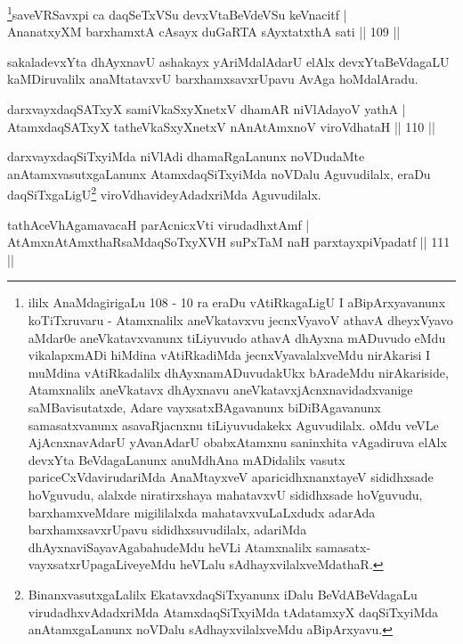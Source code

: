 \begin{shl}
\footnote{ililx AnaMdagirigaLu 108 - 10 ra eraDu vAtiRkagaLigU I aBipArxyavanunx koTiTxruvaru - Atamxnalilx aneVkatavxvu jecnxVyavoV athavA dheyxVyavo aMdar0e aneVkatavxvanunx tiLiyuvudo athavA dhAyxna mADuvudo eMdu vikalapxmADi hiMdina vAtiRkadiMda jecnxVyavalalxveMdu nirAkarisi I muMdina vAtiRkadalilx dhAyxnamADuvudakUkx bAradeMdu nirAkariside, Atamxnalilx aneVkatavx dhAyxnavu aneVkatavxjAcnxnavidadxvanige saMBavisutatxde, Adare vayxsatxBAgavanunx biDiBAgavanunx samasatxvanunx asavaRjacnxnu tiLiyuvudakekx Aguvudilalx. oMdu veVLe AjAcnxnavAdarU yAvanAdarU obabxAtamxnu saninxhita vAgadiruva elAlx devxYta BeVdagaLanunx anuMdhAna mADidalilx vasutx pariceCxVdavirudariMda AnaMtayxveV aparicidhxnanxtayeV sididhxsade hoVguvudu, alalxde niratirxshaya mahatavxvU sididhxsade hoVguvudu, barxhamxveMdare migililalxda mahatavxvuLaLxdudx adarAda barxhamxsavxrUpavu sididhxsuvudilalx, adariMda dhAyxnaviSayavAgabahudeMdu heVLi Atamxnalilx samasatx-vayxsatxrUpagaLiveyeMdu heVLalu sAdhayxvilalxveMdathaR.}saveVRSavxpi ca daqSeTxVSu devxVtaBeVdeVSu keVnacitf |\\
AnanatxyXM barxhamxtA cAsayx duGaRTA sAyxtatxthA sati \hfill || 109 ||
\end{shl}

\begin{artha}
sakaladevxYta dhAyxnavU ashakayx yAriMdalAdarU elAlx devxYtaBeVdagaLU kaMDiruvalilx anaMtatavxvU barxhamxsavxrUpavu AvAga hoMdalAradu.
\end{artha}

\begin{shl}
darxvayxdaqSATxyX samiVkaSxyXnetxV dhamAR niVlAdayoV yathA |\\
AtamxdaqSATxyX tatheVkaSxyXnetxV nAnAtAmxnoV viroVdhataH \hfill || 110 ||
\end{shl}

\begin{artha}
darxvayxdaqSiTxyiMda niVlAdi dhamaRgaLanunx noVDudaMte anAtamxvasutxgaLanunx AtamxdaqSiTxyiMda noVDalu Aguvudilalx, eraDu daqSiTxgaLigU\footnote{BinanxvasutxgaLalilx EkatavxdaqSiTxyanunx iDalu BeVdABeVdagaLu virudadhxvAdadxriMda AtamxdaqSiTxyiMda tAdatamxyX daqSiTxyiMda anAtamxgaLanunx noVDalu sAdhayxvilalxveMdu aBipArxyavu.} viroVdhavideyAdadxriMda Aguvudilalx.
\end{artha}


\begin{shl}
tathAceVhA\s \s gamavacaH parAcnicxVti virudadhxtAmf |\\
AtAmxnAtAmxthaRsaMdaqSoTxyXVH suPxTaM naH parxtayxpiVpadatf \hfill || 111 ||
\end{shl}


